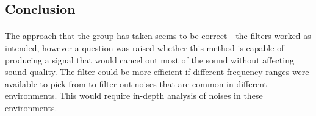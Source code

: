 \subsection{Conclusion}
\paragraph{} The approach that the group has taken seems to be correct - the filters worked as intended, however a question was raised whether this method is capable of producing a signal that would cancel out most of the sound without affecting sound quality. The filter could be more efficient if different frequency ranges were available to pick from to filter out noises that are common in different environments. This would require in-depth analysis of noises in these environments.  


  